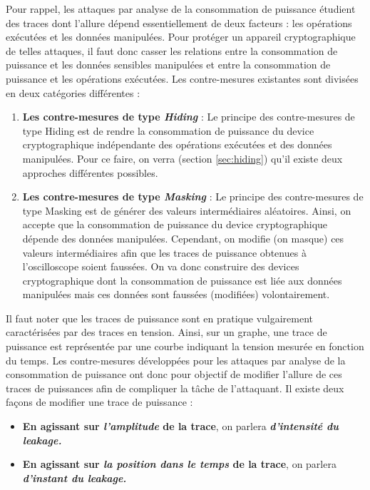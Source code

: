 \documentclass[10pt, oneside, a4paper]{article}
\begin{document}
Pour rappel, les attaques par analyse de la consommation de puissance étudient des traces dont l'allure dépend essentiellement de deux facteurs : les opérations exécutées et les données manipulées. Pour protéger un appareil cryptographique de telles attaques, il faut donc casser les relations entre la consommation de puissance et les données sensibles manipulées et entre la consommation de puissance et les opérations exécutées. Les contre-mesures existantes sont divisées en deux catégories différentes : 
\begin{enumerate}
\item \textbf{Les contre-mesures de type \textit{Hiding}} : Le principe des contre-mesures de type Hiding est de rendre la consommation de puissance du device cryptographique indépendante des opérations exécutées et des données manipulées. Pour ce faire, on verra (section \ref{sec:hiding}) qu'il existe deux approches différentes possibles.
\item \textbf{Les contre-mesures de type \textit{Masking}} : Le principe des contre-mesures de type Masking est de générer des valeurs intermédiaires aléatoires. Ainsi, on accepte que la consommation de puissance du device cryptographique dépende des données manipulées. Cependant, on modifie (on masque) ces valeurs intermédiaires afin que les traces de puissance obtenues à l'oscilloscope soient faussées. On va donc construire des devices cryptographique dont la consommation de puissance est liée aux données manipulées mais ces données sont faussées (modifiées) volontairement. \\
\end{enumerate}

\vspace{-0.2 cm}Il faut noter que les traces de puissance sont en pratique vulgairement caractérisées par des traces en tension. Ainsi, sur un graphe, une trace de puissance est représentée par une courbe indiquant la tension mesurée en fonction du temps. Les contre-mesures développées pour les attaques par analyse de la consommation de puissance ont donc pour objectif de modifier l'allure de ces traces de puissances afin de compliquer la tâche de l'attaquant. Il existe deux façons de modifier une trace de puissance : 
\begin{itemize}
\item \textbf{En agissant sur \textit{l'amplitude} de la trace}, on parlera \textbf{\textit{d'intensité du leakage.}}
\item \textbf{En agissant sur \textit{la position dans le temps} de la trace}, on parlera \textbf{\textit{d'instant du leakage.}} \\
\end{itemize}
\end{document}
